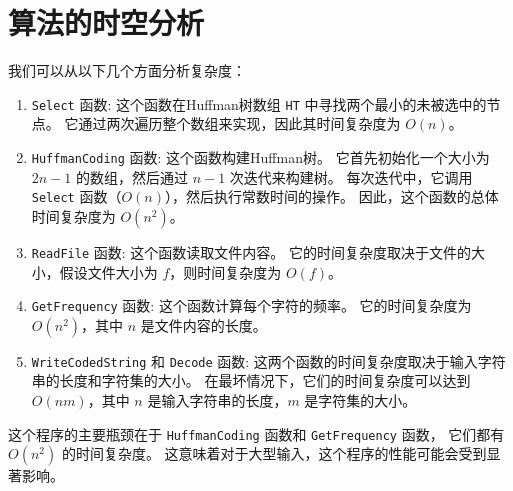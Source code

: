 \documentclass[UTF8]{ctexart}
\begin{document}
\section{算法的时空分析}
我们可以从以下几个方面分析复杂度：
\begin{enumerate}
  \item \lstinline{Select} 函数: 这个函数在Huffman树数组 \lstinline{HT} 中寻找两个最小的未被选中的节点。
  它通过两次遍历整个数组来实现，因此其时间复杂度为 $O(n)$。
  \item \lstinline{HuffmanCoding} 函数: 这个函数构建Huffman树。
  它首先初始化一个大小为 $2n-1$ 的数组，然后通过 $n-1$ 次迭代来构建树。
  每次迭代中，它调用 \lstinline{Select} 函数（$O(n)$），然后执行常数时间的操作。
  因此，这个函数的总体时间复杂度为 $O(n^2)$。
  \item \lstinline{ReadFile} 函数: 这个函数读取文件内容。
  它的时间复杂度取决于文件的大小，假设文件大小为 $f$，则时间复杂度为 $O(f)$。
  \item \lstinline{GetFrequency} 函数: 这个函数计算每个字符的频率。
  它的时间复杂度为 $O(n^2)$，其中 $n$ 是文件内容的长度。
  \item \lstinline{WriteCodedString} 和 \lstinline{Decode} 函数: 
  这两个函数的时间复杂度取决于输入字符串的长度和字符集的大小。
  在最坏情况下，它们的时间复杂度可以达到 $O(nm)$，其中 $n$ 是输入字符串的长度，$m$ 是字符集的大小。
\end{enumerate}

这个程序的主要瓶颈在于 \lstinline{HuffmanCoding} 函数和 \lstinline{GetFrequency} 函数，
它们都有 $O(n^2)$ 的时间复杂度。
这意味着对于大型输入，这个程序的性能可能会受到显著影响。
\end{document}
